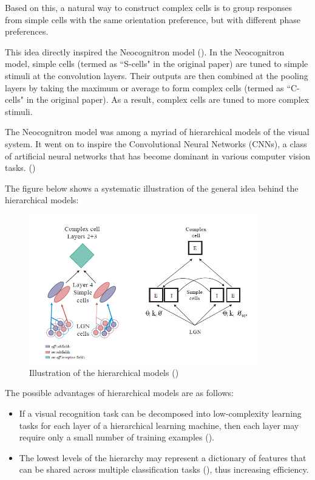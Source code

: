 \par Based on this, a natural way to construct complex cells is to group responses from simple cells with the same orientation preference, but with different phase preferences.

\par This idea directly inspired the Neocognitron model (\cite{fukushima_neocognitron_1980}). In the Neocognitron model, simple cells (termed as ``S-cells" in the original paper) are tuned to simple stimuli at the convolution layers. Their outputs are then combined at the pooling layers by taking the maximum or average to form complex cells (termed as ``C-cells" in the original paper). As a result, complex cells are tuned to more complex stimuli. 

\par The Neocognitron model was among a myriad of hierarchical models of the visual system. It went on to inspire the Convolutional Neural Networks (CNNs), a class of artificial neural networks that has become dominant in various computer vision tasks. (\cite{yamashita_convolutional_2018})

\par The figure below shows a systematic illustration of the general idea behind the hierarchical models:
\begin{figure}[H]
\centering
    \includegraphics[width=10cm]{figures/models/hierarchical-models.png}
     \caption{Illustration of the hierarchical models (\cite{martinez_complex_2003})}
\end{figure}

\par The possible advantages of hierarchical models are as follows:
\begin{itemize}
    \item If a visual recognition task can be decomposed into low-complexity learning tasks for each layer of a hierarchical learning machine, then each layer may require only a small number of training examples (\cite{poggio2003mathematics}).
    \item The lowest levels of the hierarchy may represent a dictionary of features that can be shared across multiple classification tasks (\cite{geman1999hierarchy}), thus increasing efficiency.
\end{itemize}

